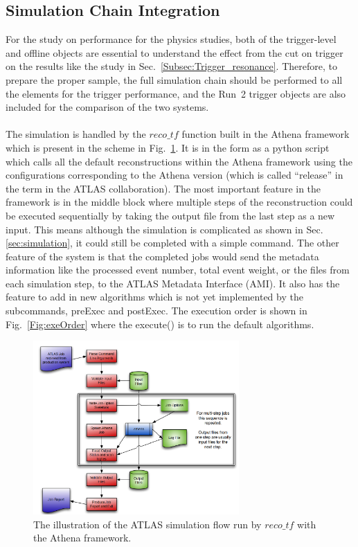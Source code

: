 \subsection{Simulation Chain Integration}
For the study on performance for the physics studies, both of the trigger-level and offline objects are essential to understand the effect from the cut on trigger on the results like the study in Sec.~\ref{Subsec:Trigger_resonance}. Therefore, to prepare the proper sample, the full simulation chain should be performed to all the elements for the trigger performance, and the Run~2 trigger objects are also included for the comparison of the two systems. 
\\
\\The simulation is handled by the $reco\_tf$ function built in the Athena framework which is present in the scheme in Fig.~\ref{Fig:reco_tf}. It is in the form as a python script which calls all the default reconstructions within the Athena framework using the configurations corresponding to the Athena version (which is called ``release'' in the term in the ATLAS collaboration). The most important feature in the framework is in the middle block where multiple steps of the reconstruction could be executed sequentially by taking the output file from the last step as a new input. This means although the simulation is complicated as shown in Sec.\ref{sec:simulation}, it could still be completed with a simple command. The other feature of the system is that the completed jobs would send the metadata information like the processed event number, total event weight, or the files from each simulation step, to the ATLAS Metadata Interface (AMI). It also has the feature to add in new algorithms which is not yet implemented by the subcommands, preExec and postExec. The execution order is shown in Fig.~\ref{Fig:exeOrder} where the execute() is to run the default algorithms. 
\begin{figure}[!h]                
	\includegraphics[width=0.70\textwidth]{Chapter6/reco_tf.png}
	\begin{center}
		\caption{The illustration of the ATLAS simulation flow run by $reco\_tf$ with the Athena framework\cite{Stewart:2014ida}.}
		\label{Fig:reco_tf}            
	\end{center}
\end{figure}
